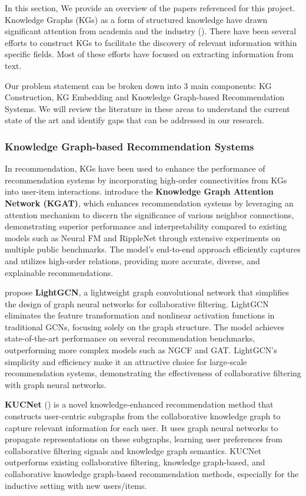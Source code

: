 \documentclass{article}
\begin{document}
In this section, We provide an overview of the papers referenced for this project. Knowledge Graphs (KGs) as a form of structured knowledge have drawn significant attention from academia and the industry (\cite{ji2022survey}). There have been several efforts to construct KGs to facilitate the discovery of relevant information within specific fields. Most of these efforts have focused on extracting information from text.

Our problem statement can be broken down into 3 main components: KG Construction, KG Embedding and Knowledge Graph-based Recommendation Systems. We will review the literature in these areas to understand the current state of the art and identify gaps that can be addressed in our research.

\subsubsection{Knowledge Graph-based Recommendation Systems}

In recommendation, KGs have been used to enhance the performance of recommendation systems by incorporating high-order connectivities from KGs into user-item interactions. \textbf{\cite{wang2019kgat}} introduce the \textbf{Knowledge Graph Attention Network (KGAT)}, which enhances recommendation systems by leveraging an attention mechanism to discern the significance of various neighbor connections, demonstrating superior performance and interpretability compared to existing models such as Neural FM and RippleNet through extensive experiments on multiple public benchmarks. The model's end-to-end approach efficiently captures and utilizes high-order relations, providing more accurate, diverse, and explainable recommendations.

\textbf{\cite{he2020lightgcn}} propose \textbf{LightGCN}, a lightweight graph convolutional network that simplifies the design of graph neural networks for collaborative filtering. LightGCN eliminates the feature transformation and nonlinear activation functions in traditional GCNs, focusing solely on the graph structure. The model achieves state-of-the-art performance on several recommendation benchmarks, outperforming more complex models such as NGCF and GAT. LightGCN's simplicity and efficiency make it an attractive choice for large-scale recommendation systems, demonstrating the effectiveness of collaborative filtering with graph neural networks.

\textbf{KUCNet} (\textbf{\cite{liu2024knowledgeenhanced}}) is a novel knowledge-enhanced recommendation method that constructs user-centric subgraphs from the collaborative knowledge graph to capture relevant information for each user. It uses graph neural networks to propagate representations on these subgraphs, learning user preferences from collaborative filtering signals and knowledge graph semantics. KUCNet outperforms existing collaborative filtering, knowledge graph-based, and collaborative knowledge graph-based recommendation methods, especially for the inductive setting with new users/items.
\end{document}
